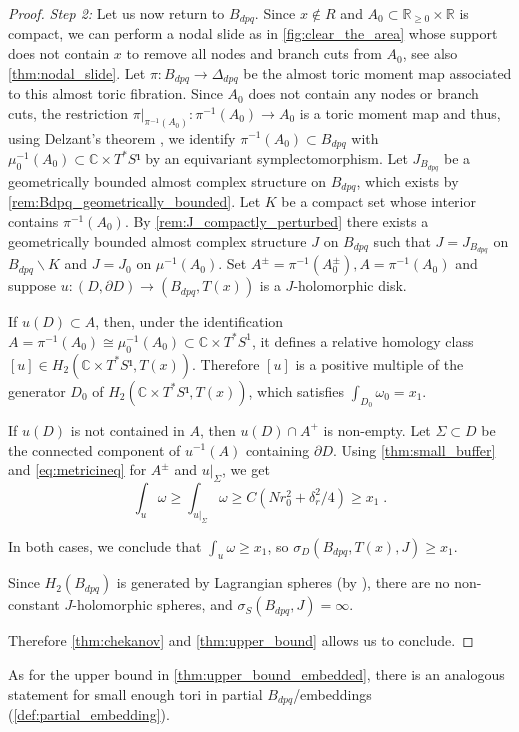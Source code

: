 \documentclass[AIF,Unicode,manuscript]{cedram}
\begin{document}
\begin{proof}
  \emph{Step 2:}
  Let us now return to $B_{dpq}$.
  Since $x \notin R$ and $A_0 \subset \mathbb{R}_{≥ 0} \times \mathbb{R}$ is compact, we can perform a nodal slide as in \cref{fig:clear_the_area} whose support does not contain $x$ to remove all nodes and branch cuts from $A_0$, see also \cref{thm:nodal_slide}.
  Let $\pi \colon B_{dpq} \rightarrow \Delta_{dpq}$ be the almost toric moment map associated to this almost toric fibration.
  Since $A_0$ does not contain any nodes or branch cuts, the restriction $\pi\vert_{\pi^{-1}(A_0)} \colon \pi^{-1}(A_0) \rightarrow A_0$ is a toric moment map and thus, using Delzant's theorem \cite[Theorem 2.1]{Del88}, we identify $\pi^{-1}(A_0) ⊂ B_{dpq}$ with $μ_0^{-1}(A_0) ⊂ ℂ × T^* S¹$ by an equi\-va\-ri\-ant symplectomorphism.
  Let $J_{B_{dpq}}$ be a geometrically bounded almost complex structure on $B_{dpq}$, which exists by \cref{rem:Bdpq_geometrically_bounded}.
  Let $K$ be a compact set whose interior contains $π^{-1}(A_0)$.
  By \cref{rem:J_compactly_perturbed} there exists a geometrically bounded almost complex structure $J$ on $B_{dpq}$ such that $J=J_{B_{dpq}}$ on $B_{dpq} ∖ K$ and $J=J_0$ on $μ^{-1}(A_0)$.
  Set $A^± = \pi^{-1}(A_0^±), A = \pi^{-1}(A_0)$ and suppose $u\colon (D,∂D) → (B_{dpq}, T(x))$ is a $J$-holomorphic disk. 
  
  If $u(D) ⊂ A$, then, under the identification $A=\pi^{-1}(A_0) \cong μ_0^{-1}(A_0) \subset \mathbb{C} \times T^*S^1$, it defines a relative homology class $[u] ∈ H_2(ℂ × T^*S¹, T(x))$.
Therefore $[u]$ is a positive multiple of the generator $D_0$ of $H_2(ℂ × T^*S¹, T(x))$, which satisfies $∫_{D_0} ω_0 = x_1$.
  
  If $u(D)$ is not contained in $A$, then $u(D) ∩ A^+$ is non-empty.
Let $Σ ⊂ D$ be the connected component of $u^{-1}(A)$ containing $∂D$.
Using \cref{thm:small_buffer} and \eqref{eq:metricineq} for $A^±$ and $u|_Σ$, we get
  \[∫_u ω ≥ ∫_{u|_Σ} ω ≥ C(Nr_0^2 + δ_r^2/4) ≥ x_1 \;. \]

In both cases, we conclude that $∫_{u} ω ≥ x_1$, so $σ_D(B_{dpq},T(x),J) ≥ x_1$.

Since $H_2(B_{dpq})$ is generated by Lagrangian spheres (by \cite[Lemma 7.11]{evans2021atfs}), there are no non-constant $J$-holomorphic spheres, and $σ_S(B_{dpq},J) = ∞$.

Therefore \cref{thm:chekanov} and \cref{thm:upper_bound} allows us to conclude.
\end{proof}

As for the upper bound in \cref{thm:upper_bound_embedded}, there is an analogous statement for small enough tori in partial $B_{dpq}$\-/embeddings (\cref{def:partial_embedding}).
\end{document}
